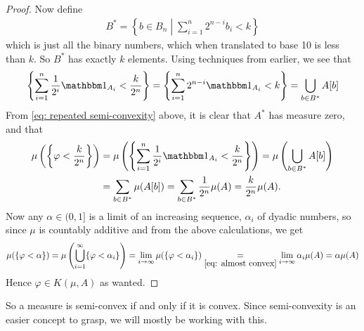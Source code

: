 \documentclass[../../main.tex]{subfiles}
\begin{document}
\begin{proof}
Now define
\begin{align*}
	B^{*}=\left\{b\in B_{n} \middle| \sum_{i=1}^{n} 2^{n-i}b_{i} < k \right\}
\end{align*}
which is just all the binary numbers, which when translated to base 10 is less than $k$. So $B^{*}$ has exactly $k$ elements. Using techniques from earlier, we see that
\begin{align*}
	\left\{ \sum_{i=1}^{n} \frac{1}{2^{i}} \ind{A_{i}} < \frac{k}{2^{n}} \right\} = \left\{ \sum_{i=1}^{n} 2^{n-i} \ind{A_{i}} < k \right\} = \bigcup_{b\in B^{*}} A[b]
\end{align*}
From \eqref{eq: repeated semi-convexity} above, it is clear that $A^{*}$ has measure zero, and that
\begin{align}
	\mu\left( \left\{ \varphi < \frac{k}{2^{n}} \right\} \right) &= \mu\left( \left\{ \sum_{i=1}^{n} \frac{1}{2^{i}}\ind{A_{i}} < \frac{k}{2^{n}} \right\} \right) = \mu\left( \bigcup_{b\in B^{*}} A[b] \right) \nonumber \\
	&= \sum_{b\in B^{*}} \mu(A[b]) = \sum_{b\in B^{*}} \frac{1}{2^{n}} \mu(A) = \frac{k}{2^{n}}\mu(A). \label{eq: almost convex}
\end{align}
Now any $\alpha\in (0,1]$ is a limit of an increasing sequence, $\alpha_{i}$ of dyadic numbers, so since $\mu$ is countably additive and from the above calculations, we get
\begin{align*}
	\mu( \{ \varphi < \alpha \} ) = \mu\left( \bigcup_{i=1}^{\infty} \{ \varphi < \alpha_{i} \} \right) = \lim_{i\to \infty} \mu( \{ \varphi < \alpha_{i} \} ) \underset{\eqref{eq: almost convex}}{=} \lim_{i\to \infty} \alpha_{i}\mu(A) = \alpha \mu(A)
\end{align*}
Hence $\varphi\in K(\mu, A)$ as wanted.
\end{proof}

So a measure is semi-convex if and only if it is convex. Since semi-convexity is an easier concept to grasp, we will mostly be working with this.

\end{document}
